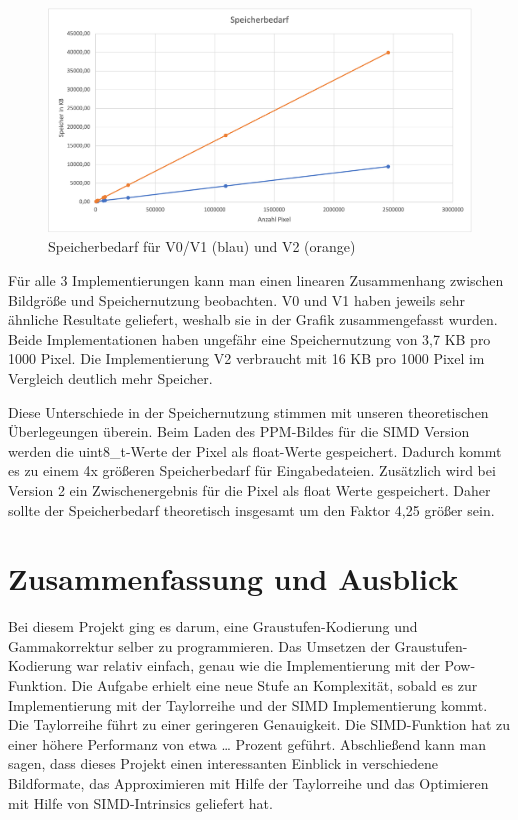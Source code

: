 \documentclass[course=erap]{aspdoc}
\begin{document}
\begin{figure}[h]
\centering
\includegraphics[width=1\textwidth]{Bilder/Speicherbedarf2.png}
\caption{Speicherbedarf für V0/V1 (blau) und V2 (orange)}
\end{figure}

\par
Für alle 3 Implementierungen kann man einen linearen Zusammenhang zwischen Bildgröße und Speichernutzung beobachten. V0 und V1 haben jeweils sehr ähnliche Resultate geliefert, weshalb sie in der Grafik zusammengefasst wurden. Beide Implementationen haben ungefähr eine Speichernutzung von 3,7 KB pro 1000 Pixel. Die Implementierung V2 verbraucht mit 16 KB pro 1000 Pixel im Vergleich deutlich mehr Speicher.

\par
Diese Unterschiede in der Speichernutzung stimmen mit unseren theoretischen Überlegeungen überein. Beim Laden des PPM-Bildes für die SIMD Version werden die uint8\_t-Werte der Pixel als float-Werte gespeichert. Dadurch kommt es zu einem 4x größeren Speicherbedarf für Eingabedateien. Zusätzlich wird bei Version 2 ein Zwischenergebnis für die Pixel als float Werte gespeichert. Daher sollte der Speicherbedarf theoretisch insgesamt um den Faktor 4,25 größer sein. 

\section{Zusammenfassung und Ausblick}

\par
Bei diesem Projekt ging es darum, eine Graustufen-Kodierung und Gammakorrektur selber zu programmieren. Das Umsetzen der Graustufen-Kodierung war relativ einfach, genau wie die Implementierung mit der Pow-Funktion. Die Aufgabe erhielt eine neue Stufe an Komplexität, sobald es zur Implementierung mit der Taylorreihe und der SIMD Implementierung kommt. Die Taylorreihe führt zu einer geringeren Genauigkeit. Die SIMD-Funktion hat zu einer höhere Performanz von etwa … Prozent geführt. Abschließend kann man sagen, dass dieses Projekt einen interessanten Einblick in verschiedene Bildformate, das Approximieren mit Hilfe der Taylorreihe und das Optimieren mit Hilfe von SIMD-Intrinsics geliefert hat.
\end{document}
